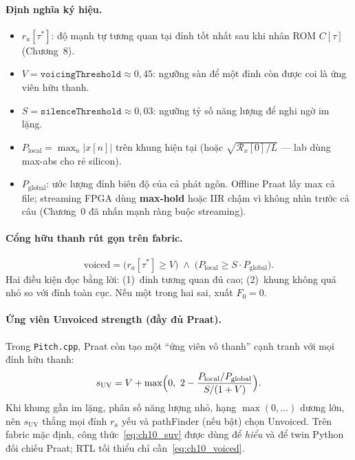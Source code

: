 \paragraph{Định nghĩa ký hiệu.}
\begin{itemize}[leftmargin=1.4em]
    \item $r_a[\tau^*]$: độ mạnh tự tương quan tại đỉnh tốt nhất sau khi nhân ROM $C[\tau]$ (Chương~8).
    \item $V = \texttt{voicingThreshold}\approx 0{,}45$: ngưỡng sàn để một đỉnh còn được coi là ứng viên hữu thanh.
    \item $S = \texttt{silenceThreshold}\approx 0{,}03$: ngưỡng tỷ số năng lượng để nghi ngờ im lặng.
    \item $P_{\mathrm{local}} = \max_n |x[n]|$ trên khung hiện tại (hoặc $\sqrt{\mathcal{R}_x[0]/L}$ --- lab dùng max-abs cho rẻ silicon).
    \item $P_{\mathrm{global}}$: ước lượng đỉnh biên độ của cả phát ngôn. Offline Praat lấy max cả file; streaming FPGA dùng \textbf{max-hold} hoặc IIR chậm vì không nhìn trước cả câu (Chương~0 đã nhấn mạnh ràng buộc streaming).
\end{itemize}

\paragraph{Cổng hữu thanh rút gọn trên fabric.}
\begin{equation}
\label{eq:ch10_voiced}
\mathrm{voiced}=\bigl(r_a[\tau^*]\ge V\bigr)\;\land\;
\bigl(P_{\mathrm{local}}\ge S\cdot P_{\mathrm{global}}\bigr).
\end{equation}
Hai điều kiện đọc bằng lời: (1)~đỉnh tương quan đủ cao; (2)~khung không quá nhỏ so với đỉnh toàn cục. Nếu một trong hai sai, xuất $F_0=0$.

\paragraph{Ứng viên Unvoiced strength (đầy đủ Praat).}
Trong \texttt{Pitch.cpp}, Praat còn tạo một ``ứng viên vô thanh'' cạnh tranh với mọi đỉnh hữu thanh:
\begin{equation}
\label{eq:ch10_suv}
s_{\mathrm{UV}}=V+\max\Bigl(0,\ 2-\frac{P_{\mathrm{local}}/P_{\mathrm{global}}}{S/(1+V)}\Bigr).
\end{equation}
Khi khung gần im lặng, phân số năng lượng nhỏ, hạng $\max(0,\ldots)$ dương lớn, nên $s_{\mathrm{UV}}$ thắng mọi đỉnh $r_a$ yếu và pathFinder (nếu bật) chọn Unvoiced. Trên fabric mặc định, công thức~\eqref{eq:ch10_suv} được dùng để \emph{hiểu} và để twin Python đối chiếu Praat; RTL tối thiểu chỉ cần~\eqref{eq:ch10_voiced}.

